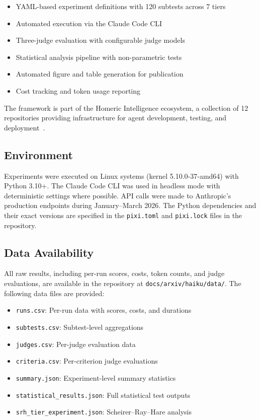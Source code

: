 \documentclass[11pt]{article}
\begin{document}
\begin{itemize}
  \item YAML-based experiment definitions with 120 subtests across 7 tiers
  \item Automated execution via the Claude Code CLI~\cite{anthropic2024claude}
  \item Three-judge evaluation with configurable judge models
  \item Statistical analysis pipeline with non-parametric tests
  \item Automated figure and table generation for publication
  \item Cost tracking and token usage reporting
\end{itemize}

The framework is part of the Homeric Intelligence ecosystem, a collection of
12 repositories providing infrastructure for agent development, testing, and
deployment~\cite{projectodyssey}.

\subsection{Environment}

Experiments were executed on Linux systems (kernel 5.10.0-37-amd64) with
Python 3.10+. The Claude Code CLI was used in headless mode with deterministic
settings where possible. API calls were made to Anthropic's production
endpoints during January--March 2026. The Python dependencies and their
exact versions are specified in the \texttt{pixi.toml} and
\texttt{pixi.lock} files in the repository.

\subsection{Data Availability}

All raw results, including per-run scores, costs, token counts, and judge
evaluations, are available in the repository at
\texttt{docs/arxiv/haiku/data/}. The following data files are provided:

\begin{itemize}
  \item \texttt{runs.csv}: Per-run data with scores, costs, and durations
  \item \texttt{subtests.csv}: Subtest-level aggregations
  \item \texttt{judges.csv}: Per-judge evaluation data
  \item \texttt{criteria.csv}: Per-criterion judge evaluations
  \item \texttt{summary.json}: Experiment-level summary statistics
  \item \texttt{statistical\_results.json}: Full statistical test outputs
  \item \texttt{srh\_tier\_experiment.json}: Scheirer--Ray--Hare analysis
\end{itemize}
\end{document}
